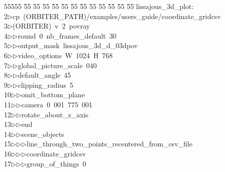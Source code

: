 %
%
\begin{tabbing}
55555 \= 55 \= 55 \= 55 \= 55 \= 55 \= 55 \= 55 \= 55 \= 55 \= 55 \= 55 \= 55 \= \>lissajous\_3d\_plot:\\[0pt]
2\>$\triangleright$\>cp\ (ORBITER\_PATH)/examples/users\_guide/coordinate\_gridcsv\ \\[0pt]
3\>$\triangleright$\>(ORBITER)\ v\ 2\ povray\ \\[0pt]
4\>$\triangleright$\>$\triangleright$\>round\ 0\ nb\_frames\_default\ 30\ \\[0pt]
5\>$\triangleright$\>$\triangleright$\>output\_mask\ lissajous\_3d\_d\_03dpov\ \\[0pt]
6\>$\triangleright$\>$\triangleright$\>video\_options\ W\ 1024\ H\ 768\ \\[0pt]
7\>$\triangleright$\>$\triangleright$\>global\_picture\_scale\ 040\ \\[0pt]
8\>$\triangleright$\>$\triangleright$\>default\_angle\ 45\ \\[0pt]
9\>$\triangleright$\>$\triangleright$\>clipping\_radius\ 5\ \\[0pt]
10\>$\triangleright$\>$\triangleright$\>omit\_bottom\_plane\ \\[0pt]
11\>$\triangleright$\>$\triangleright$\>camera\ 0\ 001\ 775\ 001\ \\[0pt]
12\>$\triangleright$\>$\triangleright$\>rotate\_about\_z\_axis\ \\[0pt]
13\>$\triangleright$\>$\triangleright$\>end\ \\[0pt]
14\>$\triangleright$\>$\triangleright$\>scene\_objects\ \\[0pt]
15\>$\triangleright$\>$\triangleright$\>$\triangleright$\>line\_through\_two\_points\_recentered\_from\_csv\_file\ \\[0pt]
16\>$\triangleright$\>$\triangleright$\>$\triangleright$\>coordinate\_gridcsv\ \\[0pt]
17\>$\triangleright$\>$\triangleright$\>$\triangleright$\>group\_of\_things\ 0\ \\[0pt]

\end{tabbing}
